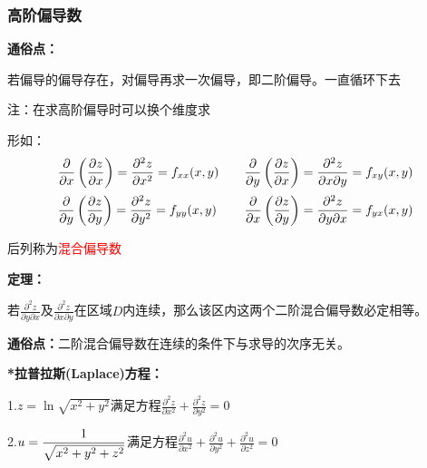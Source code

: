 \documentclass{article} %
\begin{document}
\subsubsection{高阶偏导数}
\textbf{通俗点：}\par
\hspace{10mm}若偏导的偏导存在，对偏导再求一次偏导，即二阶偏导。一直循环下去\par
\hspace{10mm}注：在求高阶偏导时可以换个维度求\par
形如：
$$
\begin{array}{lcl}
    \displaystyle \frac{\partial}{\partial x}\left(\frac{\partial z}{\partial x}\right)=\frac{\partial^2 z}{\partial x^2}=f_{xx}(x,y) &
    &
    \displaystyle \frac{\partial}{\partial y}\left(\frac{\partial z}{\partial x}\right)=\frac{\partial^2 z}{\partial x \partial y}=f_{xy}(x,y) \vspace{2mm}\\
    \displaystyle \frac{\partial}{\partial y}\left(\frac{\partial z}{\partial y}\right)=\frac{\partial^2 z}{\partial y^2}=f_{yy}(x,y) &
    &
    \displaystyle \frac{\partial}{\partial x}\left(\frac{\partial z}{\partial y}\right)=\frac{\partial^2 z}{\partial y \partial x}=f_{yx}(x,y) \\
\end{array}
$$\par
后列称为\textcolor{red}{混合偏导数}\par
\vspace{3mm}
\textbf{定理：}\par
\hspace{10mm}若$\displaystyle\frac{\partial^2 z}{\partial y \partial x}$及$\displaystyle\frac{\partial^2 z}{\partial x \partial y}$在区域$D$内连续，那么该区内这两个二阶混合偏导数必定相等。\par
\textbf{通俗点：}二阶混合偏导数在连续的条件下与求导的次序无关。\par
\vspace{5mm}
\textbf{*拉普拉斯(Laplace)方程：}\par

\hspace{20mm}1.$z=\ln{\sqrt{x^2+y^2}}$满足方程$\displaystyle\frac{\partial^2 z}{\partial x^2}+\frac{\partial^2 z}{\partial y^2}=0$\par
\hspace{3mm}

\hspace{20mm}2.$\displaystyle u={1\over\sqrt{x^2+y^2+z^2}}$满足方程$\displaystyle\frac{\partial^2 u}{\partial x^2}+\frac{\partial^2 u}{\partial y^2}+\frac{\partial^2 u}{\partial z^2}=0$\par
\end{document}
